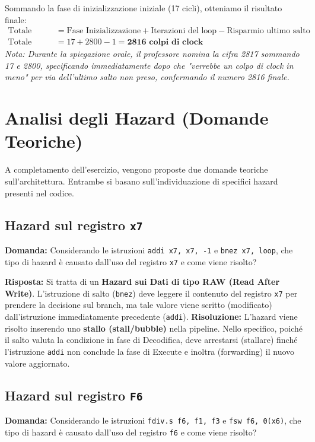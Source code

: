 Sommando la fase di inizializzazione iniziale (17 cicli), otteniamo il risultato finale:
\begin{align*}
\text{Totale Cicli} &= \text{Fase Inizializzazione} + \text{Iterazioni del loop} - \text{Risparmio ultimo salto} \\
\text{Totale Cicli} &= 17 + 2800 - 1 = \mathbf{2816 \text{ colpi di clock}}
\end{align*}
\textit{Nota: Durante la spiegazione orale, il professore nomina la cifra 2817 sommando 17 e 2800, specificando immediatamente dopo che "verrebbe un colpo di clock in meno" per via dell'ultimo salto non preso, confermando il numero 2816 finale.}

\section{Analisi degli Hazard (Domande Teoriche)}

A completamento dell'esercizio, vengono proposte due domande teoriche sull'architettura. Entrambe si basano sull'individuazione di specifici hazard presenti nel codice.

\subsection{Hazard sul registro \texttt{x7}}
\textbf{Domanda:} Considerando le istruzioni \texttt{addi x7, x7, -1} e \texttt{bnez x7, loop}, che tipo di hazard è causato dall'uso del registro \texttt{x7} e come viene risolto?

\textbf{Risposta:} Si tratta di un \textbf{Hazard sui Dati di tipo RAW (Read After Write)}. L'istruzione di salto (\texttt{bnez}) deve leggere il contenuto del registro \texttt{x7} per prendere la decisione sul branch, ma tale valore viene scritto (modificato) dall'istruzione immediatamente precedente (\texttt{addi}). 
\textbf{Risoluzione:} L'hazard viene risolto inserendo uno \textbf{stallo (stall/bubble)} nella pipeline. Nello specifico, poiché il salto valuta la condizione in fase di Decodifica, deve arrestarsi (stallare) finché l'istruzione \texttt{addi} non conclude la fase di Execute e inoltra (forwarding) il nuovo valore aggiornato.

\subsection{Hazard sul registro \texttt{F6}}
\textbf{Domanda:} Considerando le istruzioni \texttt{fdiv.s f6, f1, f3} e \texttt{fsw f6, 0(x6)}, che tipo di hazard è causato dall'uso del registro \texttt{f6} e come viene risolto?

